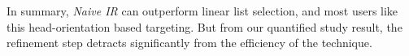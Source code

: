 In summary, {\em Naive IR} can outperform linear list selection, and most users like this head-orientation based targeting. But from our quantified study result, the refinement step detracts significantly from the efficiency of the technique.








